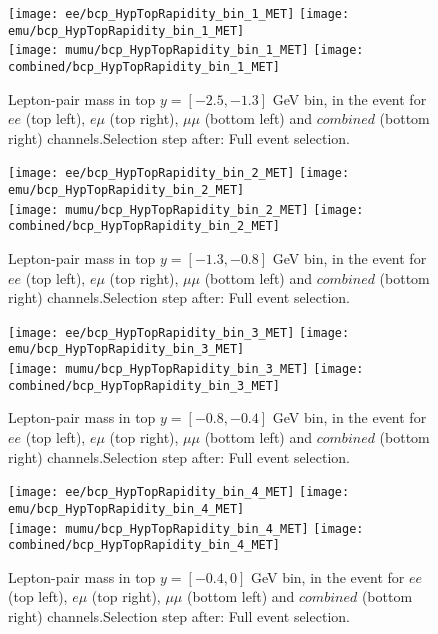\begin{figure}
  \texttt{[image: ee/bcp\_HypTopRapidity\_bin\_1\_MET]}
  \texttt{[image: emu/bcp\_HypTopRapidity\_bin\_1\_MET]}\\
  \texttt{[image: mumu/bcp\_HypTopRapidity\_bin\_1\_MET]}
  \texttt{[image: combined/bcp\_HypTopRapidity\_bin\_1\_MET]}
\caption{Lepton-pair mass in top $y = [-2.5,-1.3]$ GeV bin, in the event for $ee$ (top left), $e\mu$ (top right), $\mu\mu$ (bottom left) and $combined$ (bottom right) channels.\newline Selection step after: Full event selection.}
\end{figure}

\clearpage
\newpage


\begin{figure}
  \texttt{[image: ee/bcp\_HypTopRapidity\_bin\_2\_MET]}
  \texttt{[image: emu/bcp\_HypTopRapidity\_bin\_2\_MET]}\\
  \texttt{[image: mumu/bcp\_HypTopRapidity\_bin\_2\_MET]}
  \texttt{[image: combined/bcp\_HypTopRapidity\_bin\_2\_MET]}
\caption{Lepton-pair mass in top $y = [-1.3,-0.8]$ GeV bin, in the event for $ee$ (top left), $e\mu$ (top right), $\mu\mu$ (bottom left) and $combined$ (bottom right) channels.\newline Selection step after: Full event selection.}
\end{figure}

\clearpage
\newpage


\begin{figure}
  \texttt{[image: ee/bcp\_HypTopRapidity\_bin\_3\_MET]}
  \texttt{[image: emu/bcp\_HypTopRapidity\_bin\_3\_MET]}\\
  \texttt{[image: mumu/bcp\_HypTopRapidity\_bin\_3\_MET]}
  \texttt{[image: combined/bcp\_HypTopRapidity\_bin\_3\_MET]}
\caption{Lepton-pair mass in top $y = [-0.8,-0.4]$ GeV bin, in the event for $ee$ (top left), $e\mu$ (top right), $\mu\mu$ (bottom left) and $combined$ (bottom right) channels.\newline Selection step after: Full event selection.}
\end{figure}

\clearpage
\newpage

\begin{figure}
  \texttt{[image: ee/bcp\_HypTopRapidity\_bin\_4\_MET]}
  \texttt{[image: emu/bcp\_HypTopRapidity\_bin\_4\_MET]}\\
  \texttt{[image: mumu/bcp\_HypTopRapidity\_bin\_4\_MET]}
  \texttt{[image: combined/bcp\_HypTopRapidity\_bin\_4\_MET]}
\caption{Lepton-pair mass in top $y = [-0.4,0]$ GeV bin, in the event for $ee$ (top left), $e\mu$ (top right), $\mu\mu$ (bottom left) and $combined$ (bottom right) channels.\newline Selection step after: Full event selection.}
\end{figure}

